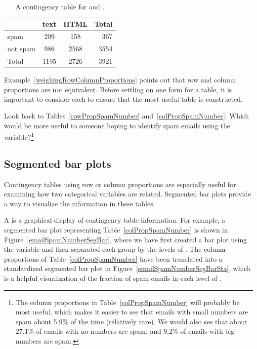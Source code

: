 \begin{table}[ht]
\centering
\begin{tabular}{l cc r}
  \hline
 & text & HTML & Total \\
  \hline
spam & 209 & 158 & 367 \\
not spam & 986 & 2568 & 3554 \\
   \hline
Total & 1195 & 2726 & 3921 \\
   \hline
\end{tabular}
\caption{A contingency table for  and .}
\label{emailSpamHTMLTableTotals}
\end{table}

Example~\ref{weighingRowColumnProportions} points out that row and column proportions are not equivalent. Before settling on one form for a table, it is important to consider each to ensure that the most useful table is constructed.

\begin{exercise}
Look back to Tables~\ref{rowPropSpamNumber} and~\ref{colPropSpamNumber}. Which would be more useful to someone hoping to identify spam emails using the  variable?\footnote{The column proportions in Table~\ref{colPropSpamNumber} will probably be most useful, which makes it easier to see that emails with small numbers are spam about 5.9\% of the time (relatively rare). We would also see that about 27.1\% of emails with no numbers are spam, and 9.2\% of emails with big numbers are spam.}
\end{exercise}


\subsection{Segmented bar plots}
\label{segmentedBarPlotsAndIndependence}

Contingency tables using row or column proportions are especially useful for examining how two categorical variables are related. Segmented bar plots provide a way to visualize the information in these tables.

A  is a graphical display of contingency table information. For example, a segmented bar plot representing Table~\ref{colPropSpamNumber} is shown in Figure~\ref{emailSpamNumberSegBar}, where we have first created a bar plot using the  variable and then separated each group by the levels of . The column proportions of Table~\ref{colPropSpamNumber} have been translated into a standardized segmented bar plot in Figure~\ref{emailSpamNumberSegBarSta}, which is a helpful visualization of the fraction of spam emails in each level of .

